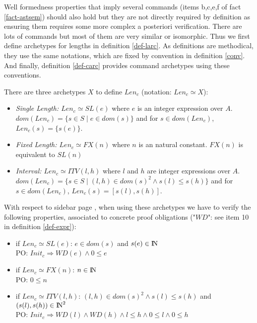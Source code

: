\documentclass{article}
\newcommand{\NAT}{\mbox{\normalfont I$\!$N}}
\begin{document}
Well formedness properties that imply several commands (items b,c,e,f of fact \ref{fact-astsem}) should also hold but they are not directly required by definition as ensuring them requires some more complex a posteriori verification. There are lots of commands but most of them are very similar or isomorphic. Thus we first define archetypes for lengths in definition \ref{def-larc}. As definitions are methodical, they use the same notations, which are fixed by convention in definition \ref{conv}. And finally, definition \ref{def-carc} provides command archetypes using these conventions.
\begin{definition}\label{def-larc}$~$\\
There are three archetypes $X$ to define $Len_c$ (notation: $Len_c\simeq X$):
\begin{itemize}
\item {\em Single Length: $Len_c\simeq SL(e)$} where $e$ is an integer expression over $A$.\\
      $dom(Len_c)=\{s\in S\mid e\in dom(s)\}$ and for $s\in dom(Len_c)$, $Len_c(s)=\{s(e)\}$.
\item {\em Fixed Length: $Len_c\simeq FX(n)$} where $n$ is an natural constant. $FX(n)$ is equivalent to $SL(n)$
\item {\em Interval: $Len_c\simeq ITV(l,h)$} where $l$ and $h$ are integer expressions over $A$.\\
      $dom(Len_c)=\{s\in S\mid (l,h)\in dom(s)^2 \wedge s(l)\leq s(h)\}$ and for $s\in dom(Len_c)$, $Len_c(s)=[s(l),s(h)]$.
\end{itemize}
\end{definition}
With respect to sidebar page \pageref{safestates}, when using these archetypes we have to verify the following properties, associated to concrete proof obligations ("$W\!D$": see item 10 in definition \ref{def-expr}):
   \begin{itemize}
	 \item if $Len_c\simeq SL(e)$: $e\in dom(s)$ and $s(e)\in\NAT$\\
	       PO: $Init_c\Rightarrow W\!D(e) \wedge 0\leq e$
	 \item if $Len_c\simeq FX(n)$: $n\in\NAT$\\
	       PO: $0\leq n$
	 \item if $Len_c\simeq ITV(l,h)$: $(l,h)\in dom(s)^2\wedge s(l)\leq s(h)$ and $(s(l),s(h))\in\NAT^2$\\
	       PO: $Init_c\Rightarrow W\!D(l) \wedge W\!D(h) \wedge l\leq h \wedge 0\leq l\wedge 0\leq h$
	 \end{itemize}
\end{document}
